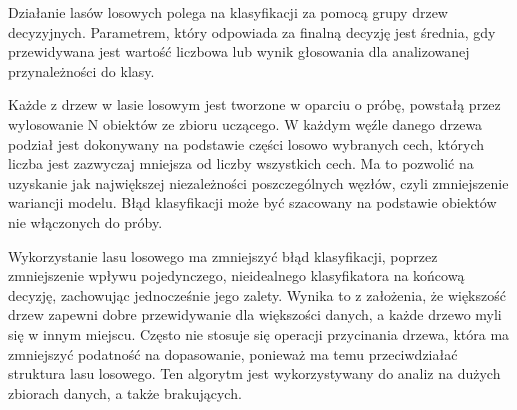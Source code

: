 Działanie lasów losowych polega na klasyfikacji za pomocą grupy drzew decyzyjnych. Parametrem, który odpowiada za finalną decyzję jest średnia, gdy przewidywana jest wartość liczbowa lub wynik głosowania dla analizowanej przynależności do klasy.

Każde z drzew w lasie losowym jest tworzone w oparciu o próbę, powstałą przez wylosowanie N obiektów ze zbioru uczącego. W każdym węźle danego drzewa podział jest dokonywany na podstawie części losowo wybranych cech, których liczba jest zazwyczaj mniejsza od liczby wszystkich cech. Ma to pozwolić na uzyskanie jak największej niezależności poszczególnych węzłów, czyli zmniejszenie wariancji modelu. 
Błąd klasyfikacji może być szacowany na podstawie obiektów nie włączonych do próby.

Wykorzystanie lasu losowego ma zmniejszyć błąd klasyfikacji, poprzez zmniejszenie wpływu pojedynczego, nieidealnego klasyfikatora na końcową decyzję, zachowując jednocześnie jego zalety. Wynika
to z założenia, że większość drzew zapewni dobre przewidywanie dla większości danych, a każde
drzewo myli się w innym miejscu. Często nie stosuje się operacji przycinania drzewa, która ma zmniejszyć podatność na dopasowanie, ponieważ ma temu przeciwdziałać struktura lasu losowego.  Ten algorytm jest wykorzystywany do analiz na dużych zbiorach danych,
a także brakujących.





